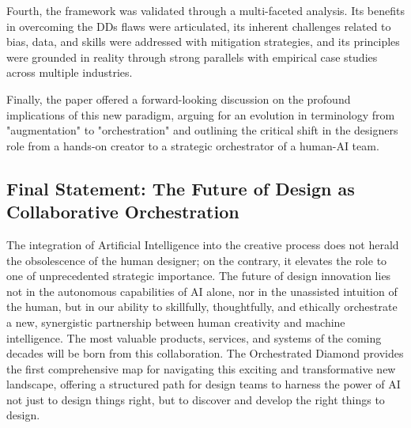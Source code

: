 \documentclass[
  12pt,
  a4paper,
  bibliography=totoc,
  numbers=noenddot
]{scrartcl}
\begin{document}
Fourth, the framework was validated through a multi-faceted analysis.
Its benefits in overcoming the DD\textquotesingle s flaws were
articulated, its inherent challenges related to bias, data, and skills
were addressed with mitigation strategies, and its principles were
grounded in reality through strong parallels with empirical case studies
across multiple industries.

Finally, the paper offered a forward-looking discussion on the profound
implications of this new paradigm, arguing for an evolution in
terminology from "augmentation" to "orchestration" and outlining the
critical shift in the designer\textquotesingle s role from a hands-on
creator to a strategic orchestrator of a human-AI team.

\subsection{Final Statement: The Future
of Design as Collaborative
Orchestration}\label{final-statement-the-future-of-design-as-collaborative-orchestration}

The integration of Artificial Intelligence into the creative process
does not herald the obsolescence of the human designer; on the contrary,
it elevates the role to one of unprecedented strategic importance. The
future of design innovation lies not in the autonomous capabilities of
AI alone, nor in the unassisted intuition of the human, but in our
ability to skillfully, thoughtfully, and ethically orchestrate a new,
synergistic partnership between human creativity and machine
intelligence. The most valuable products, services, and systems of the
coming decades will be born from this collaboration. The Orchestrated
Diamond provides the first comprehensive map for navigating this
exciting and transformative new landscape, offering a structured path
for design teams to harness the power of AI not just to design things
right, but to discover and develop the right things to design.

\printbibliography
\end{document}
